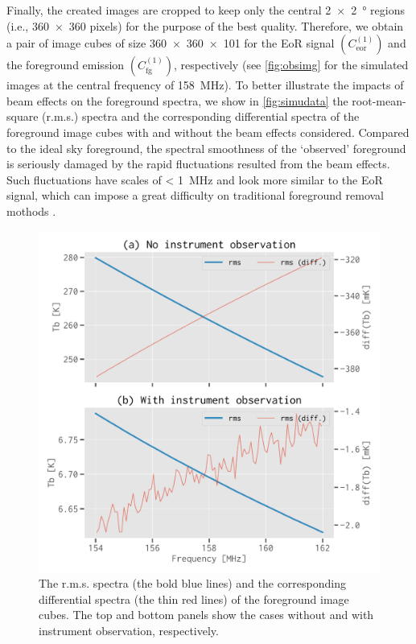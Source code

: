 \documentclass[fleqn,usenatbib]{mnras}
\newcommand{\R}[1]{\mathrm{#1}}
\newcommand{\editone}[1]{{\leavevmode\color{cyan}#1}}
\begin{document}
Finally, the created images are cropped to keep only the central
\SI{2 x 2}{\degree} regions (i.e., \num{360 x 360} pixels) for the
purpose of the best quality.
Therefore, we obtain \editone{a pair of} image cubes of size
\num{360 x 360 x 101} for the EoR signal $\left( C_{\R{eor}}^{(1)} \right)$
and the foreground emission $\left( C_{\R{fg}}^{(1)} \right)$, respectively
\editone{%
(see \autoref{fig:obsimg} for the simulated images at the central frequency
of \SI{158}{\MHz}).
To better illustrate the impacts of beam effects on the foreground spectra,
we show in \autoref{fig:simudata} the root-mean-square (r.m.s\@.) spectra
and the corresponding differential spectra of the foreground image cubes
with and without the beam effects considered.
Compared to the ideal sky foreground, the spectral smoothness of the
`observed' foreground is seriously damaged by the rapid fluctuations
resulted from the beam effects.
Such fluctuations have scales of \SI{< 1}{\MHz} and look more similar to
the EoR signal, which can impose a great difficulty on traditional
foreground removal mothods \citep[e.g.,][]{liu2009ps}.
} %

\begin{figure}
  \centering
  \includegraphics[width=\columnwidth]{simudata}
  \caption{\label{fig:simudata}\editone{%
    The r.m.s\@. spectra (the bold blue lines) and the corresponding
    differential spectra (the thin red lines) of the foreground image
    cubes.} %
    The top and bottom panels show the cases without and with instrument
    observation, respectively.
  }
\end{figure}
\end{document}
